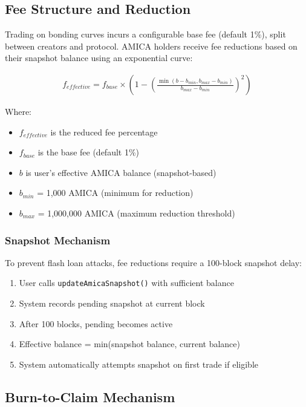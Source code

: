 \documentclass{article}
\begin{document}
\subsection{Fee Structure and Reduction}

Trading on bonding curves incurs a configurable base fee (default 1\%), split between creators and protocol. AMICA holders receive fee reductions based on their snapshot balance using an exponential curve:

\begin{align}
f_{effective} = f_{base} \times \left(1 - \left(\frac{\min(b - b_{min}, b_{max} - b_{min})}{b_{max} - b_{min}}\right)^2\right)
\end{align}

Where:
\begin{itemize}
    \item $f_{effective}$ is the reduced fee percentage
    \item $f_{base}$ is the base fee (default 1\%)
    \item $b$ is user's effective AMICA balance (snapshot-based)
    \item $b_{min}$ = 1,000 AMICA (minimum for reduction)
    \item $b_{max}$ = 1,000,000 AMICA (maximum reduction threshold)
\end{itemize}

\subsubsection{Snapshot Mechanism}

To prevent flash loan attacks, fee reductions require a 100-block snapshot delay:

\begin{enumerate}
    \item User calls \texttt{updateAmicaSnapshot()} with sufficient balance
    \item System records pending snapshot at current block
    \item After 100 blocks, pending becomes active
    \item Effective balance = min(snapshot balance, current balance)
    \item System automatically attempts snapshot on first trade if eligible
\end{enumerate}

\subsection{Burn-to-Claim Mechanism}
\end{document}
